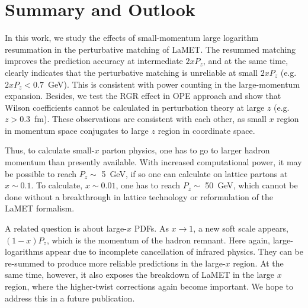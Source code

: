 \documentclass[prd,aps,twocolumn,preprintnumbers, showpacs, nofootinbib,superscriptaddress,notitlepage]{revtex4-2}
\begin{document}
\section{Summary and Outlook}\label{sec:summary}

In this work, we study the effects of small-momentum large logarithm resummation in the perturbative matching of LaMET. The resummed matching improves the prediction accuracy at intermediate $2 x P_z$, and at the same time, clearly indicates that the perturbative matching is unreliable at small $2 x P_z$ (e.g. $2xP_z<0.7$~GeV). This is consistent with power counting in the large-momentum expansion. Besides, we test the RGR effect in OPE approach and show that Wilson coefficients cannot be calculated in perturbation theory at large $z$ (e.g. $z>0.3$~fm). These observations are consistent with each other, as small $x$ region in momentum space conjugates to large $z$ region in coordinate space. 

Thus, to calculate small-$x$ parton physics, one has to 
go to larger hadron momentum than presently available. With increased computational power,
it may be possible to reach $P_z\sim$ 5~GeV, if so one can calculate
on lattice partons at $x\sim 0.1$. To calculate, $x\sim 0.01$, one
has to reach $P_z\sim $ 50~GeV, which cannot be done without a breakthrough
in lattice technology or reformulation of the LaMET formalism. 

A related question is about large-$x$ PDFs. As $x\to 1$, a new soft scale
appears, $(1-x)P_z$, which is the momentum of the hadron remnant. Here again, 
large-logarithms appear due to incomplete cancellation of infrared physics. 
They can be re-summed to produce more reliable predictions in the large-$x$ region. 
At the same time, however, it also exposes the breakdown of LaMET
in the large $x$ region, where the higher-twist corrections again
become important. We hope to address this in a future publication.



\end{document}
